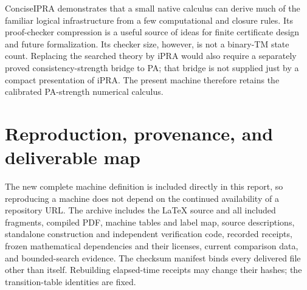 \documentclass[10pt,letterpaper]{article}
\begin{document}
ConciseIPRA demonstrates that a small native calculus can derive much of
the familiar logical infrastructure from a few computational and closure
rules\cite{ipra}. Its proof-checker compression is a useful source of ideas
for finite certificate design and future formalization. Its checker size,
however, is not a binary-TM state count. Replacing the searched theory by
iPRA would also require a separately proved consistency-strength bridge
to PA; that bridge is not supplied just by a compact presentation of iPRA.
The present machine therefore retains the calibrated PA-strength numerical
calculus.

\section{Reproduction, provenance, and deliverable map}
\label{sec:reproduction}



The new complete machine definition is included directly in this report,
so reproducing a machine does not depend on the continued availability of
a repository URL. The archive includes the LaTeX source and all included
fragments, compiled PDF, machine tables and label map, source descriptions,
standalone construction and independent verification code, recorded
receipts, frozen mathematical dependencies and their licenses, current
comparison data, and bounded-search evidence. The checksum manifest binds
every delivered file other than itself. Rebuilding elapsed-time receipts
may change their hashes; the transition-table identities are fixed.
\end{document}
